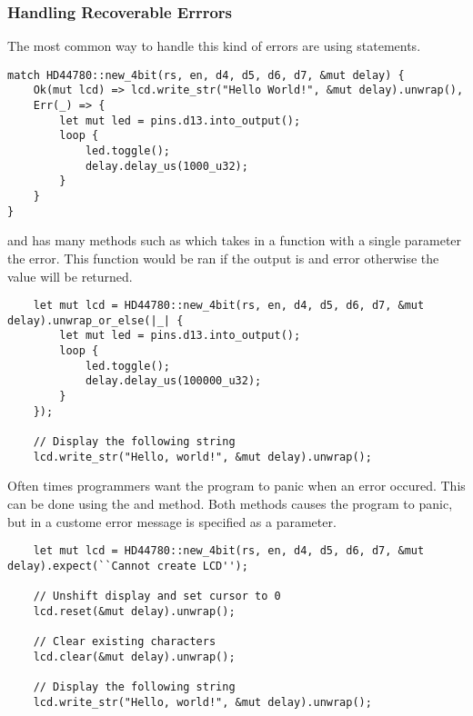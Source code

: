 \documentclass{beamer}
\begin{document}
\begin{frame}
  \frametitle[]{Handling Recoverable Errrors}
  The most common way to handle this kind of errors are using  statements.

\begin{lstlisting}
match HD44780::new_4bit(rs, en, d4, d5, d6, d7, &mut delay) {
    Ok(mut lcd) => lcd.write_str("Hello World!", &mut delay).unwrap(),
    Err(_) => {
        let mut led = pins.d13.into_output();
        loop {
            led.toggle();
            delay.delay_us(1000_u32);
        }
    }
}
\end{lstlisting}

\pagebreak

 and  has many methods such as  which takes in a function with a single parameter the error. This function would be ran if the output is and error otherwise the value  will be returned.

\begin{lstlisting}
    let mut lcd = HD44780::new_4bit(rs, en, d4, d5, d6, d7, &mut delay).unwrap_or_else(|_| {
        let mut led = pins.d13.into_output();
        loop {
            led.toggle();
            delay.delay_us(100000_u32);
        }
    });

    // Display the following string
    lcd.write_str("Hello, world!", &mut delay).unwrap();
\end{lstlisting}

\pagebreak

Often times programmers want the program to panic when an error occured. This can be done using the  and  method. Both methods causes the program to panic, but in  a custome error message is specified as a parameter.

\begin{lstlisting}
    let mut lcd = HD44780::new_4bit(rs, en, d4, d5, d6, d7, &mut delay).expect(``Cannot create LCD'');

    // Unshift display and set cursor to 0
    lcd.reset(&mut delay).unwrap();

    // Clear existing characters
    lcd.clear(&mut delay).unwrap();

    // Display the following string
    lcd.write_str("Hello, world!", &mut delay).unwrap();
\end{lstlisting}

\pagebreak


\end{frame}
\end{document}
